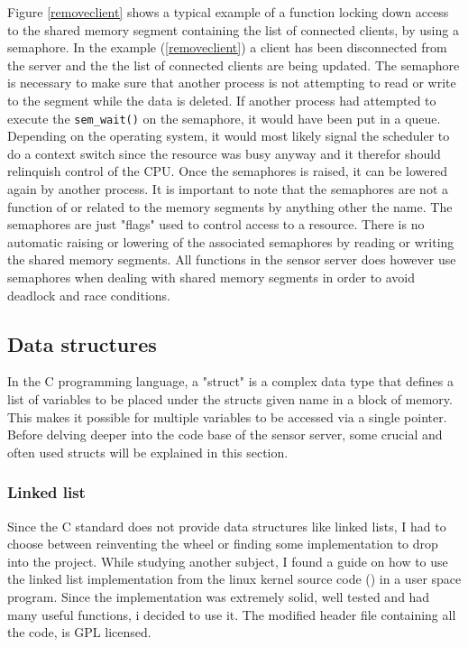 \documentclass[12pt,english,a4paper]{report}
\begin{document}
Figure \ref{removeclient} shows a typical example of a function locking down access to the shared memory segment containing the list of connected clients, by using a semaphore. In the example (\ref{removeclient}) a client has been disconnected from the server and the the list of connected clients are being updated. The semaphore is necessary to make sure that another process is not attempting to read or write to the segment while the data is deleted. If another process had attempted to execute the \texttt{sem\_wait()} on the semaphore, it would have been put in a queue. Depending on the operating system, it would most likely signal the scheduler to do a context switch since the resource was busy anyway and it therefor should relinquish control of the CPU. Once the semaphores is raised, it can be lowered again by another process. It is important to note that the semaphores are not a function of or related to the memory segments by anything other the name. The semaphores are just "flags" used to control access to a resource. There is no automatic raising or lowering of the associated semaphores by reading or writing the shared memory segments. All functions in the sensor server does however use semaphores when dealing with shared memory segments in order to avoid deadlock and race conditions.

\subsection{Data structures}
In the C programming language, a "struct" is a complex data type that defines a list of variables to be placed under the structs given name in a block of memory. This makes it possible for multiple variables to be accessed via a single pointer. Before delving deeper into the code base of the sensor server, some crucial and often used structs will be explained in this section.

\subsubsection{Linked list}
Since the C standard does not provide data structures like linked lists, I had to choose between reinventing the wheel or finding some implementation to drop into the project. While studying another subject, I found a guide on how to use the linked list implementation from the linux kernel source code (\cite{KAZU_LIST}) in a user space program. Since the implementation was extremely solid, well tested and had many useful functions, i decided to use it. The modified header file containing all the code, is GPL licensed.  
\end{document}
